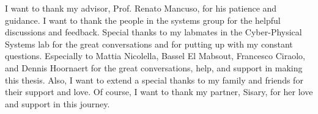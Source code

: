 I want to thank my advisor, Prof. Renato Mancuso, for his patience and guidance. I want to thank the people in the systems group for the helpful discussions and feedback. Special thanks to my labmates in the Cyber-Physical Systems lab for the great conversations and for putting up with my constant questions. Especially to Mattia Nicolella, Bassel El Mabsout, Francesco Ciraolo, and Dennis Hoornaert for the great conversations, help, and support in making this thesis. Also, I want to extend a special thanks to my family and friends for their support and love. Of course, I want to thank my partner, Sisary, for her love and support in this journey.







